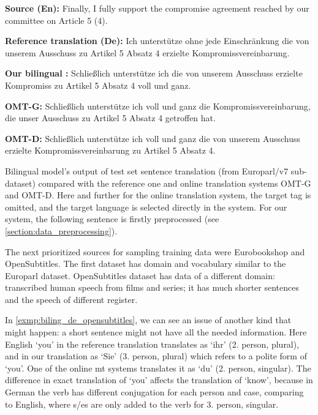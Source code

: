 \vspace{\baselineskip}
\begin{minipage}[t]{0.9\textwidth}

\textbf{Source (En):}   Finally, I fully support the compromise agreement reached by our committee on Article 5 (4).

\textbf{Reference translation (De):}
Ich unterstütze ohne jede Einschränkung die von unserem Ausschuss
zu Artikel 5 Absatz 4 erzielte Kompromissvereinbarung.

\textbf{Our bilingual :}
Schließlich unterstütze ich die von unserem Ausschuss erzielte
Kompromiss zu Artikel 5 Absatz 4 voll und ganz.

\textbf{OMT-G:}
Schließlich unterstütze ich voll und ganz die Kompromissvereinbarung,
die unser Ausschuss zu Artikel 5 Absatz 4 getroffen hat.

\textbf{OMT-D:}
Schließlich unterstütze ich voll und ganz die von unserem Ausschuss
erzielte Kompromissvereinbarung zu Artikel 5 Absatz 4.

	\begin{exmp}
	Bilingual  model's output of test set sentence
	translation (from Europarl/v7 sub-dataset)
	compared with the reference one and online
	translation systems OMT-G and OMT-D.
	Here and further for the online translation system, the target
	tag is omitted, and the target language is selected directly
	in the system.
	For our system, the following sentence is firstly preprocessed
	(see \cref{section:data_preprocessing}).
	\label{exmp:biling_de_europarl}
	\end{exmp}

\end{minipage}
\vspace{\baselineskip}


The next prioritized sources for sampling training data were
Eurobookshop and OpenSubtitles.
The first dataset has domain and vocabulary similar to the Europarl dataset.
OpenSubtitles dataset has data of a different domain:
transcribed human speech from films and series;
it has much shorter sentences and the speech of different register.

In \cref{exmp:biling_de_opensubtitles}, we can see an issue of another kind
that might happen: a short sentence might not have all
the needed information. Here English `you' in the reference translation
translates as `ihr' (2. person, plural), and in our translation
as `Sie' (3. person, plural) which refers to a polite form of `you'.
One of the online \acrshort{mt} systems translates it as
`du' (2. person, singular).
The difference in exact translation of `you' affects the translation of
`know', because in German the verb has different conjugation for each
person and case, comparing to English, where s/es are only added
to the verb for 3. person, singular.


